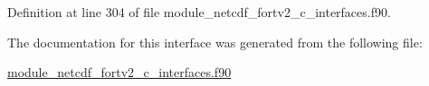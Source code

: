 Definition at line 304 of file module\+\_\+netcdf\+\_\+fortv2\+\_\+c\+\_\+interfaces.\+f90.



The documentation for this interface was generated from the following file\+:\begin{DoxyCompactItemize}
\item 
\hyperlink{module__netcdf__fortv2__c__interfaces_8f90}{module\+\_\+netcdf\+\_\+fortv2\+\_\+c\+\_\+interfaces.\+f90}\end{DoxyCompactItemize}
